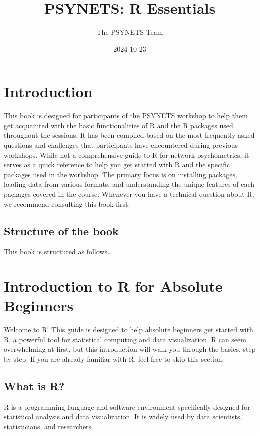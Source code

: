 \documentclass[
]{book}
\title{PSYNETS: R Essentials}
\author{The PSYNETS Team}
\date{2024-10-23}
\begin{document}
\maketitle

{
\setcounter{tocdepth}{1}
\tableofcontents
}
\chapter{Introduction}\label{introduction}

This book is designed for participants of the PSYNETS workshop to help them get acquainted with the basic functionalities of R and the R packages used throughout the sessions. It has been compiled based on the most frequently asked questions and challenges that participants have encountered during previous workshops. While not a comprehensive guide to R for network psychometrics, it serves as a quick reference to help you get started with R and the specific packages used in the workshop. The primary focus is on installing packages, loading data from various formats, and understanding the unique features of each packages covered in the course. Whenever you have a technical question about R, we recommend consulting this book first.

\section{Structure of the book}\label{structure-of-the-book}

This book is structured as follows\ldots{}

\chapter{Introduction to R for Absolute Beginners}\label{introduction-to-r-for-absolute-beginners}

Welcome to R! This guide is designed to help absolute beginners get started with R, a powerful tool for statistical computing and data visualization. R can seem overwhelming at first, but this introduction will walk you through the basics, step by step. If you are already familiar with R, feel free to skip this section.

\section{What is R?}\label{what-is-r}

R is a programming language and software environment specifically designed for statistical analysis and data visualization. It is widely used by data scientists, statisticians, and researchers.
\end{document}
